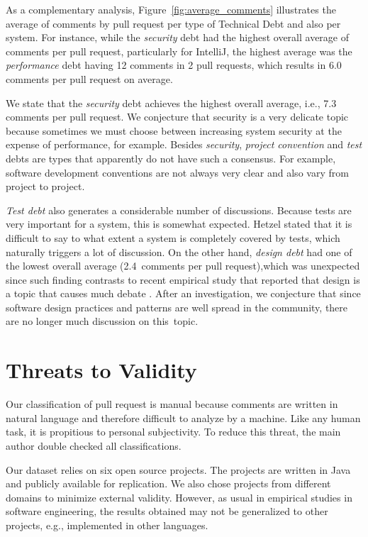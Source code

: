 \documentclass{sig-alternate}
\begin{document}
As a complementary analysis, 
Figure~\ref{fig:average_comments}
illustrates the average of comments by pull request per type of Technical Debt and also per system.  
For instance,
while the {\em security} debt had
the highest overall average of comments per pull request,
particularly for IntelliJ, the highest average was the {\em performance} debt having 12 comments in 2 pull requests, which results in 6.0 comments per pull request on average.



We state that the {\em security} debt achieves the highest overall average, i.e., 7.3 comments per pull request.
We conjecture that security is a very delicate topic because sometimes we must choose between increasing system security at the expense of performance, for example.
%
Besides {\em security}, {\em project convention} and {\em test} debts are types that 
apparently do not have such a consensus.
For example, software development conventions are not always very clear
and also vary from project to project. 


{\em Test debt} also generates a considerable number of discussions.
Because tests are very important for a system, this is somewhat expected. Hetzel \cite{19} stated that it is difficult to say to what extent a system is completely covered by tests, which naturally triggers a lot of discussion.
On the other hand, {\em design debt} had one of the lowest overall average (2.4~comments per pull request),which was unexpected since such finding contrasts to recent empirical study that reported that design is a topic that causes much debate \cite{18}.
After an investigation, we conjecture that
since software design practices and patterns are well spread in the community, 
there are no longer much discussion on this~topic.
%


\section{Threats to Validity}
\label{sec:threats}
Our classification of pull request is manual because comments are written in natural language and therefore difficult to analyze by a machine. 
%
Like any human task, it is propitious to personal subjectivity. To reduce this threat, the main author double checked all classifications.

Our dataset relies on six open source projects. The projects are written in Java and publicly available for replication. We also chose projects from different domains to minimize external validity. However, as usual in empirical studies in software engineering, the results obtained may not be generalized to other projects, e.g., implemented in other languages.\\
\end{document}
